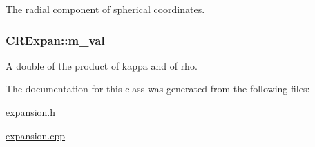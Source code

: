 The radial component of spherical coordinates. 

\hypertarget{classCRExpan_ad4aa5ad1140a14d8d51dc65054797739}{
\subsubsection[{m\-\_\-val}]{ C\-R\-Expan\-::m\-\_\-val\hspace{0.3cm}{\ttfamily [protected]}}}\label{classCRExpan_ad4aa5ad1140a14d8d51dc65054797739}


A double of the product of kappa and of rho. 



The documentation for this class was generated from the following files\-:\begin{DoxyCompactItemize}
\item 
\hyperlink{expansion_8h}{expansion.\-h}\item 
\hyperlink{expansion_8cpp}{expansion.\-cpp}\end{DoxyCompactItemize}
